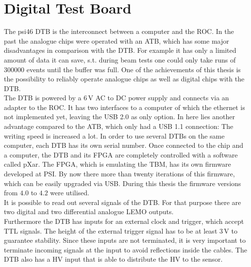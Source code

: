 \documentclass[british,11pt,a4paper]{memoir}
\begin{document}
\section{Digital Test Board}\label{sdtb}
The psi46 \ac{DTB} is the interconnect between a computer and the \ac{ROC}. In the past the analogue chips were operated with an \ac{ATB}, which has some major disadvantages in comparison with the \ac{DTB}. For example it has only a limited amount of data it can save, s.t. during beam tests one could only take runs of $300000$ events until the buffer was full. One of the achievements of this thesis is the possibility to reliably operate analogue chips as well as digital chips with the \ac{DTB}.\\
The \ac{DTB} is powered by a $6\,$V AC to DC power supply and connects via an adapter to the \ac{ROC}. It has two interfaces to a computer of which the ethernet is not implemented yet, leaving the USB 2.0 as only option. In here lies another advantage compared to the \ac{ATB}, which only had a USB 1.1 connection: The writing speed is increased a lot. In order to use several \ac{DTB}s on the same computer, each \ac{DTB} has its own serial number. Once connected to the chip and a computer, the \ac{DTB} and its \ac{FPGA} are completely controlled with a software called pXar. The \ac{FPGA}, which is emulating the \ac{TBM}, has its own firmware developed at \ac{PSI}. By now there more than twenty iterations of this firmware, which can be easily upgraded via USB. During this thesis the firmware versions from $4.0$ to $4.2$ were utilised.\\
It is possible to read out several signals of the \ac{DTB}. For that purpose there are two digital and two differential analogue LEMO outputs.\\
Furthermore the \ac{DTB} has inputs for an external clock and trigger, which accept \ac{TTL} signals. The height of the external trigger signal has to be at least $3\,$V to guarantee stability. Since these inputs are not terminated, it is very important to terminate incoming signals at the input to avoid reflections inside the cables. The \ac{DTB} also has a \ac{HV} input that is able to distribute the \ac{HV} to the sensor.
\end{document}

